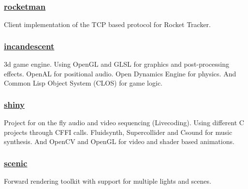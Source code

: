\documentclass[11pt]{article}
\begin{document}
\subsubsection{\href {https://github.com/azimut/rocketman} {rocketman}}
Client implementation of the TCP based protocol for Rocket Tracker.
\subsubsection{\href {https://github.com/azimut/incandescent} {incandescent}}
3d game engine. Using OpenGL and GLSL for graphics and post-processing effects. OpenAL for positional audio. Open Dynamics Engine for physics. And Common Lisp Object System (CLOS) for game logic.
\subsubsection{\href {https://github.com/azimut/shiny} {shiny}}
Project for on the fly audio and video sequencing (Livecoding). Using different C projects through CFFI calls. Fluidsynth, Supercollider and Csound for music synthesis. And OpenCV and OpenGL for video and shader based animations.
\subsubsection{\href {https://github.com/azimut/scenic} {scenic}}
Forward rendering toolkit with support for multiple lights and scenes.
\end{document}
